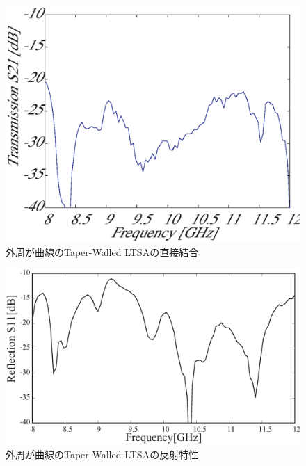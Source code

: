 ﻿\documentclass[12pt,oneside]{jsbook}
\begin{document}
\begin{figure}[t]
\begin{center}
\includegraphics[width =\hsize]{oldantenna_S21.eps}
\caption{外周が曲線のTaper-Walled LTSAの直接結合}
\label{old-solo-S21}
\end{center}
\end{figure}

\begin{figure}[t]
\begin{center}
\includegraphics[width =\hsize]{new_solo_S11.eps}
\caption{外周が曲線のTaper-Walled LTSAの反射特性}
\label{new-solo-S11}
\end{center}
\end{figure}
\end{document}
